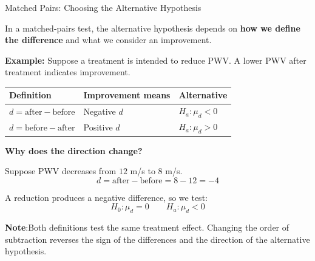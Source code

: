 \documentclass[aspectratio=169,10pt]{beamer}
\begin{document}
\begin{frame}{Matched Pairs: Choosing the Alternative Hypothesis}

\small
In a matched-pairs test, the alternative hypothesis depends on \textbf{how we define the difference} and what we consider an improvement.

\vspace{0.1cm}
\textbf{Example:} Suppose a treatment is intended to reduce PWV. A lower PWV after treatment indicates improvement.
\begin{center}
\small
\begin{tabularx}{0.90\textwidth}{
>{\RaggedRight\arraybackslash}p{}
>{\centering\arraybackslash}X
>{\centering\arraybackslash}X}
\toprule
\textbf{Definition} & \textbf{Improvement means} & \textbf{Alternative} \\
\midrule
$d=\text{after}-\text{before}$
& Negative $d$
& $H_a:\mu_d<0$ \\[0.15cm]
$d=\text{before}-\text{after}$
& Positive $d$
& $H_a:\mu_d>0$ \\
\bottomrule
\end{tabularx}
\end{center}
\textbf{Why does the direction change?}

Suppose PWV decreases from $12$ m/s to $8$ m/s.
$$d=\text{after}-\text{before}=8-12=-4$$

A reduction produces a negative difference, so we test:
$$H_0:\mu_d=0 \qquad \boxed{H_a:\mu_d<0}$$

\textbf{Note}:Both definitions test the same treatment effect. Changing the order of subtraction reverses the sign of the differences and the direction of the alternative hypothesis.
\end{frame}
\end{document}
